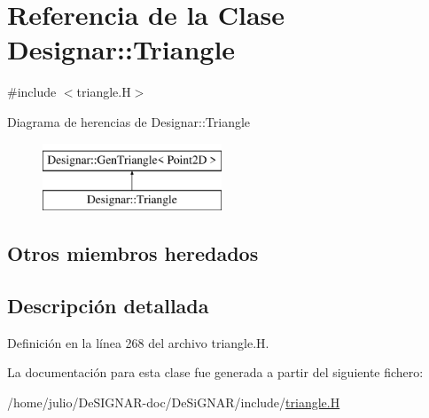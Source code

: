 \hypertarget{class_designar_1_1_triangle}{}\section{Referencia de la Clase Designar\+:\+:Triangle}
\label{class_designar_1_1_triangle}


{\ttfamily \#include $<$triangle.\+H$>$}

Diagrama de herencias de Designar\+:\+:Triangle\begin{figure}[H]
\begin{center}
\leavevmode
\includegraphics[height=2.000000cm]{class_designar_1_1_triangle}
\end{center}
\end{figure}
\subsection*{Otros miembros heredados}


\subsection{Descripción detallada}


Definición en la línea 268 del archivo triangle.\+H.



La documentación para esta clase fue generada a partir del siguiente fichero\+:\begin{DoxyCompactItemize}
\item 
/home/julio/\+De\+S\+I\+G\+N\+A\+R-\/doc/\+De\+Si\+G\+N\+A\+R/include/\hyperlink{triangle_8_h}{triangle.\+H}\end{DoxyCompactItemize}
